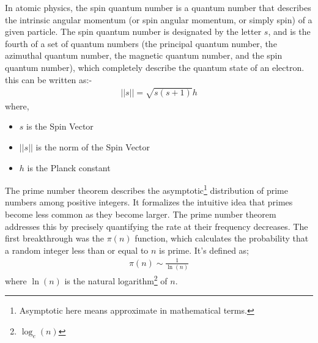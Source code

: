 \begin{chembox}{}
{In atomic physics, the spin quantum number is a quantum number that describes the intrinsic angular momentum (or spin angular momentum, or simply spin) of a given particle. The spin quantum number is designated by the letter $s$, and is the fourth of a set of quantum numbers (the principal quantum number, the azimuthal quantum number, the magnetic quantum number, and the spin quantum number), which completely describe the quantum state of an electron.
this can be written as:-
\begin{align*}
 ||s|| = \sqrt{s(s+1)}h
\end{align*}
where, 
\begin{itemize}
    \item {$s$ is the Spin Vector }
    \item{$||s||$ is the norm of the Spin Vector}
    \item{$h$ is the Planck constant}
\end{itemize}}
\end{chembox}
\begin{mathbox}{}
{The prime number theorem describes the asymptotic\footnote{Asymptotic here means approximate in mathematical terms.} distribution of prime numbers among positive integers. It formalizes the intuitive idea that primes become less common as they become larger. The prime number theorem addresses this by precisely quantifying the rate at their frequency decreases. The first breakthrough was the $\pi(n)$ function, which calculates the probability that a random integer less than or equal to $n$ is prime. It's defined as;
\begin{align*}
    \pi(n) \sim \frac{1}{\ln(n)}
\end{align*}
where $\ln (n)$ is the natural logarithm\footnote{$\log_e(n)$} of $n$.
\begin{flushleft}
\end{flushleft}}
\end{mathbox}
